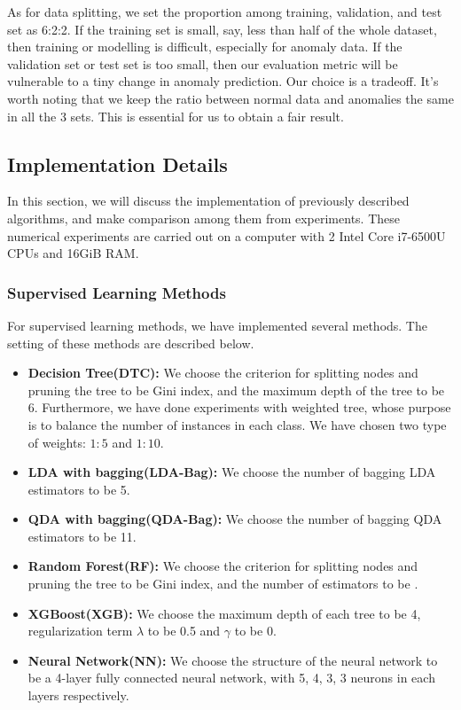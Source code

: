 \documentclass[english]{article}
\begin{document}
\par As for data splitting, we set the proportion among training, validation, and test set as 6:2:2. If the training set is small, say, less than half of the whole dataset, then training or modelling is difficult, especially for anomaly data. If the validation set or test set is too small, then our evaluation metric will be vulnerable to a tiny change in anomaly prediction. Our choice is a tradeoff. It's worth noting that we keep the ratio between normal data and anomalies the same in all the 3 sets. This is essential for us to obtain a fair result.

\subsection{Implementation Details}
\par In this section, we will discuss the implementation of previously described algorithms, and make comparison among them from experiments. These numerical experiments are carried out on a computer with 2 Intel Core i7-6500U CPUs and 16GiB RAM.

\subsubsection{Supervised Learning Methods}
\par For supervised learning methods, we have implemented several methods. The setting of these methods are described below.
\begin{itemize}
	\item\textbf{Decision Tree(DTC): } We choose the criterion for splitting nodes and pruning the tree to be Gini index, and the maximum depth of the tree to be 6. Furthermore, we have done experiments with weighted tree, whose purpose is to balance the number of instances in each class. We have chosen two type of weights: $1:5$ and $1:10$.
	\item\textbf{LDA with bagging(LDA-Bag): }We choose the number of bagging LDA estimators to be 5.
	\item\textbf{QDA with bagging(QDA-Bag): }We choose the number of bagging QDA estimators to be 11.
	\item\textbf{Random Forest(RF): } We choose the criterion for splitting nodes and pruning the tree to be Gini index, and the number of estimators to be .
	\item\textbf{XGBoost(XGB): }We choose the maximum depth of each tree to be 4, regularization term $\lambda$ to be 0.5 and $\gamma$ to be 0.
	\item\textbf{Neural Network(NN): }We choose the structure of the neural network to be a 4-layer fully connected neural network, with 5, 4, 3, 3 neurons in each layers respectively.
\end{itemize}
\end{document}
